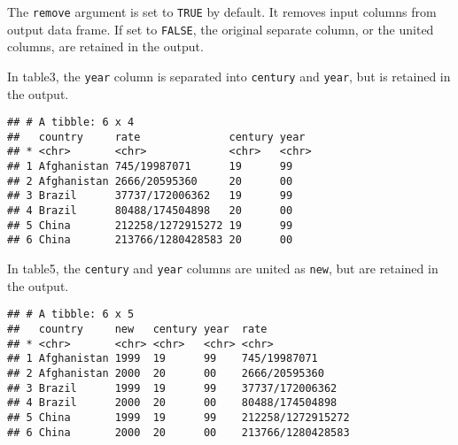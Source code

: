 \documentclass[]{article}
\newenvironment{Shaded}{\begin{snugshade}}{\end{snugshade}}
\newcommand{\KeywordTok}[1]{\textcolor[rgb]{0.13,0.29,0.53}{\textbf{#1}}}
\newcommand{\DataTypeTok}[1]{\textcolor[rgb]{0.13,0.29,0.53}{#1}}
\newcommand{\DecValTok}[1]{\textcolor[rgb]{0.00,0.00,0.81}{#1}}
\newcommand{\StringTok}[1]{\textcolor[rgb]{0.31,0.60,0.02}{#1}}
\newcommand{\OtherTok}[1]{\textcolor[rgb]{0.56,0.35,0.01}{#1}}
\newcommand{\OperatorTok}[1]{\textcolor[rgb]{0.81,0.36,0.00}{\textbf{#1}}}
\newcommand{\NormalTok}[1]{#1}
\theoremstyle{definition}
\theoremstyle{definition}
\theoremstyle{definition}
\theoremstyle{remark}
\begin{document}
The \texttt{remove} argument is set to \texttt{TRUE} by default. It
removes input columns from output data frame. If set to \texttt{FALSE},
the original separate column, or the united columns, are retained in the
output.

In table3, the \texttt{year} column is separated into \texttt{century}
and \texttt{year}, but is retained in the output.

\begin{Shaded}
\end{Shaded}

\begin{verbatim}
## # A tibble: 6 x 4
##   country     rate              century year 
## * <chr>       <chr>             <chr>   <chr>
## 1 Afghanistan 745/19987071      19      99   
## 2 Afghanistan 2666/20595360     20      00   
## 3 Brazil      37737/172006362   19      99   
## 4 Brazil      80488/174504898   20      00   
## 5 China       212258/1272915272 19      99   
## 6 China       213766/1280428583 20      00
\end{verbatim}

In table5, the \texttt{century} and \texttt{year} columns are united as
\texttt{new}, but are retained in the output.

\begin{Shaded}
\end{Shaded}

\begin{verbatim}
## # A tibble: 6 x 5
##   country     new   century year  rate             
## * <chr>       <chr> <chr>   <chr> <chr>            
## 1 Afghanistan 1999  19      99    745/19987071     
## 2 Afghanistan 2000  20      00    2666/20595360    
## 3 Brazil      1999  19      99    37737/172006362  
## 4 Brazil      2000  20      00    80488/174504898  
## 5 China       1999  19      99    212258/1272915272
## 6 China       2000  20      00    213766/1280428583
\end{verbatim}
\end{document}
